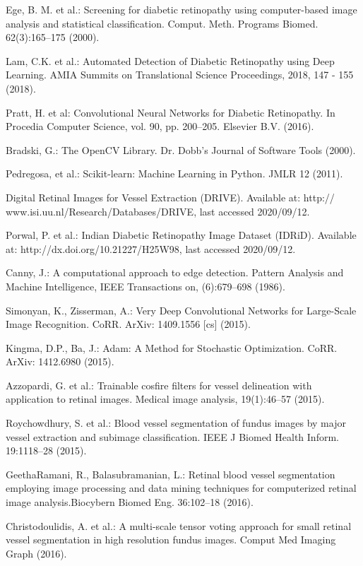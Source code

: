 \documentclass{svproc}
\begin{document}
\begin{thebibliography}{6}
Ege, B. M. et al.: Screening for diabetic retinopathy using computer-based image analysis and statistical classification. Comput. Meth. Programs Biomed. 62(3):165–175 (2000).

Lam, C.K. et al.: Automated Detection of Diabetic Retinopathy using Deep Learning. AMIA Summits on Translational Science Proceedings, 2018, 147 - 155 (2018).

Pratt, H. et al: Convolutional Neural Networks for Diabetic Retinopathy. In Procedia Computer Science, vol. 90, pp. 200–205. Elsevier B.V. (2016). 

Bradski, G.: The OpenCV Library. Dr. Dobb’s Journal of Software Tools (2000). 

Pedregosa, et al.: Scikit-learn: Machine Learning in Python. JMLR 12 (2011).

Digital Retinal Images for Vessel Extraction (DRIVE). Available at: 
http:// www.isi.uu.nl/Research/Databases/DRIVE, last accessed 2020/09/12.

Porwal, P. et al.: Indian Diabetic Retinopathy Image Dataset (IDRiD). 
Available at: http://dx.doi.org/10.21227/H25W98, last accessed 2020/09/12.

Canny, J.: A computational approach to edge detection. Pattern Analysis and Machine Intelligence, IEEE Transactions on, (6):679–698 (1986).

Simonyan, K., Zisserman, A.: Very Deep Convolutional Networks for Large-Scale Image Recognition. CoRR. ArXiv: 1409.1556 [cs] (2015).

Kingma, D.P., Ba, J.: Adam: A Method for Stochastic Optimization. CoRR. ArXiv: 1412.6980 (2015).

Azzopardi, G. et al.: Trainable cosfire filters for vessel delineation with application to retinal images. Medical image analysis, 19(1):46–57 (2015).

Roychowdhury, S. et al.: Blood vessel segmentation of fundus images by major vessel extraction and subimage classification. IEEE J Biomed Health Inform. 19:1118–28 (2015).

GeethaRamani, R., Balasubramanian, L.: Retinal blood vessel segmentation employing image processing and data mining techniques for computerized retinal image analysis.Biocybern Biomed Eng. 36:102–18 (2016).

Christodoulidis, A. et al.: A multi-scale tensor voting approach for small retinal vessel segmentation in high resolution fundus images. Comput Med Imaging Graph (2016).


\end{thebibliography}
\end{document}

